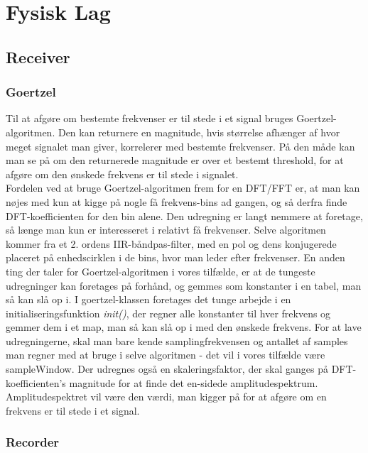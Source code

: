 \section{Fysisk Lag}

\subsection{Receiver}

\subsubsection{Goertzel}

Til at afgøre om bestemte frekvenser er til stede i et signal bruges Goertzel-algoritmen. Den kan returnere en magnitude, hvis størrelse afhænger af hvor meget signalet man giver, korrelerer med bestemte frekvenser. På den måde kan man se på om den returnerede magnitude er over et bestemt threshold, for at afgøre om den ønskede frekvens er til stede i signalet.\\

Fordelen ved at bruge Goertzel-algoritmen frem for en DFT/FFT er, at man kan nøjes med kun at kigge på nogle få frekvens-bins ad gangen, og så derfra finde DFT-koefficienten for den bin alene. Den udregning er langt nemmere at foretage, så længe man kun er interesseret i relativt få frekvenser. Selve algoritmen kommer fra et 2. ordens IIR-båndpas-filter, med en pol og dens konjugerede placeret på enhedscirklen i de bins, hvor man leder efter frekvenser. En anden ting der taler for Goertzel-algoritmen i vores tilfælde, er at de tungeste udregninger kan foretages på forhånd, og gemmes som konstanter i en tabel, man så kan slå op i. I goertzel-klassen foretages det tunge arbejde i en initialiseringsfunktion \textit{init()}, der regner alle konstanter til hver frekvens og gemmer dem i et map, man så kan slå op i med den ønskede frekvens. For at lave udregningerne, skal man bare kende samplingfrekvensen og antallet af samples man regner med at bruge i selve algoritmen - det vil i vores tilfælde være sampleWindow. Der udregnes også en skaleringsfaktor, der skal ganges på DFT-koefficienten's magnitude for at finde det en-sidede amplitudespektrum. Amplitudespektret vil være den værdi, man kigger på for at afgøre om en frekvens er til stede i et signal. 

\subsubsection{Recorder}

